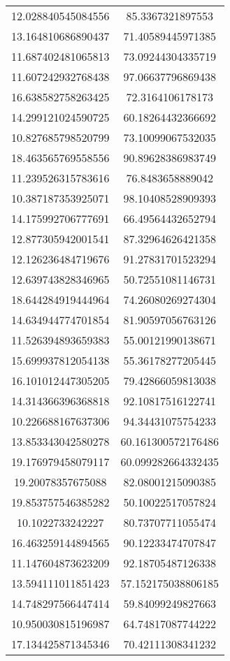 \begin{table}
\begin{tabular}{cc}
12.028840545084556 & 85.3367321897553 \\
13.164810686890437 & 71.40589445971385 \\
11.687402481065813 & 73.09244304335719 \\
11.607242932768438 & 97.06637796869438 \\
16.638582758263425 & 72.3164106178173 \\
14.299121024590725 & 60.18264432366692 \\
10.827685798520799 & 73.10099067532035 \\
18.463565769558556 & 90.89628386983749 \\
11.239526315783616 & 76.8483658889042 \\
10.387187353925071 & 98.10408528909393 \\
14.175992706777691 & 66.49564432652794 \\
12.877305942001541 & 87.32964626421358 \\
12.126236484719676 & 91.27831701523294 \\
12.639743828346965 & 50.72551081146731 \\
18.644284919444964 & 74.26080269274304 \\
14.634944774701854 & 81.90597056763126 \\
11.526394893659383 & 55.00121990138671 \\
15.699937812054138 & 55.36178277205445 \\
16.101012447305205 & 79.42866059813038 \\
14.314366396368818 & 92.10817516122741 \\
10.226688167637306 & 94.34431075754233 \\
13.853343042580278 & 60.161300572176486 \\
19.176979458079117 & 60.099282664332435 \\
19.20078357675088 & 82.08001215090385 \\
19.853757546385282 & 50.10022517057824 \\
10.1022733242227 & 80.73707711055474 \\
16.463259144894565 & 90.12233474707847 \\
11.147604873623209 & 92.18705487126338 \\
13.594111011851423 & 57.152175038806185 \\
14.748297566447414 & 59.84099249827663 \\
10.950030815196987 & 64.74817087744222 \\
17.134425871345346 & 70.42111308341232 \\

\end{tabular}
\end{table}
